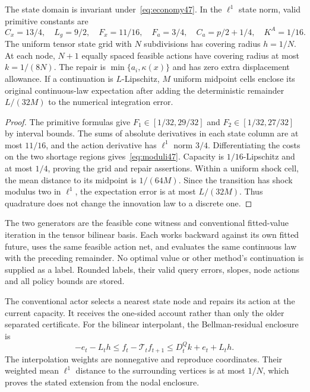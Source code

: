 \begin{proposition}\label{prop:primitive47}
The state domain is invariant under~\eqref{eq:economy47}. In the $\ell^1$ state norm, valid primitive constants are
\begin{equation}\label{eq:moduli47}
 C_x=13/4,\quad L_g=9/2,\quad F_x=11/16,\quad
 F_a=3/4,\quad C_a=p/2+1/4,\quad K^A=1/16.
\end{equation}
The uniform tensor state grid with $N$ subdivisions has covering radius $h=1/N$. At each node, $N+1$ equally spaced feasible actions have covering radius at most $k=1/(8N)$. The repair is $\min\{a_i,\kappa(x)\}$ and has zero extra displacement allowance. If a continuation is $L$-Lipschitz, $M$ uniform midpoint cells enclose its original continuous-law expectation after adding the deterministic remainder $L/(32M)$ to the numerical integration error.
\end{proposition}
\begin{proof}
The primitive formulas give $F_1\in[1/32,29/32]$ and $F_2\in[1/32,27/32]$ by interval bounds. The sums of absolute derivatives in each state column are at most $11/16$, and the action derivative has $\ell^1$ norm $3/4$. Differentiating the costs on the two shortage regions gives~\eqref{eq:moduli47}. Capacity is $1/16$-Lipschitz and at most $1/4$, proving the grid and repair assertions. Within a uniform shock cell, the mean distance to its midpoint is $1/(64M)$. Since the transition has shock modulus two in $\ell^1$, the expectation error is at most $L/(32M)$. Thus quadrature does not change the innovation law to a discrete one.
\end{proof}

The two generators are the feasible cone witness and conventional fitted-value iteration in the tensor bilinear basis. Each works backward against its own fitted future, uses the same feasible action net, and evaluates the same continuous law with the preceding remainder. No optimal value or other method's continuation is supplied as a label. Rounded labels, their valid query errors, slopes, node actions and all policy bounds are stored.

The conventional actor selects a nearest state node and repairs its action at the current capacity. It receives the one-sided account rather than only the older separated certificate. For the bilinear interpolant, the Bellman-residual enclosure is
\[
 -e_t-L_th\le f_t-\mathcal T_tf_{t+1}
       \le D_t^Qk+e_t+L_th.
\]
The interpolation weights are nonnegative and reproduce coordinates. Their weighted mean $\ell^1$ distance to the surrounding vertices is at most $1/N$, which proves the stated extension from the nodal enclosure.

